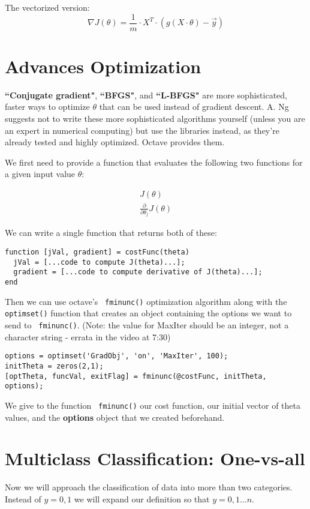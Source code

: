 The vectorized version:
\begin{equation}
\nabla J(\theta) = \frac{1}{m} \cdot X^T \cdot \left(g\left(X\cdot\theta\right) - \vec{y}\right)
\end{equation}

\section{Advances Optimization}
\textbf{``Conjugate gradient"}, \textbf{``BFGS"}, and \textbf{``L-BFGS"} are more sophisticated, faster ways to optimize $\theta$ that can be used instead of gradient descent. A. Ng suggests not to write these more sophisticated algorithms yourself (unless you are an expert in numerical computing) but use the libraries instead, as they're already tested and highly optimized. Octave provides them.

We first need to provide a function that evaluates the following two functions for a given input value $\theta$:

\begin{align*}
J(\theta)\\
\frac{\partial}{\partial\theta_j}J(\theta)
\end{align*}

We can write a single function that returns both of these:

\begin{verbatim}
function [jVal, gradient] = costFunc(theta)
  jVal = [...code to compute J(theta)...];
  gradient = [...code to compute derivative of J(theta)...];
end
\end{verbatim}

Then we can use octave's \verb| fminunc()| optimization algorithm along with the \verb|optimset()| function that creates an object containing the options we want to send to \verb| fminunc()|. (Note: the value for MaxIter should be an integer, not a character string - errata in the video at 7:30)

\begin{verbatim}
options = optimset('GradObj', 'on', 'MaxIter', 100);
initTheta = zeros(2,1);
[optTheta, funcVal, exitFlag] = fminunc(@costFunc, initTheta, options);
\end{verbatim}

We give to the function \verb| fminunc()| our cost function, our initial vector of theta values, and the \textbf{options} object that we created beforehand.

\section{Multiclass Classification: One-vs-all}
Now we will approach the classification of data into more than two categories. Instead of $y = {0,1}$ we will expand our definition so that $y = {0,1...n}$.

